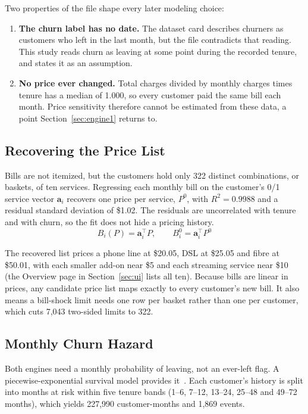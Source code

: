 \documentclass[conference]{IEEEtran}
\begin{document}
Two properties of the file shape every later modeling choice:
\begin{enumerate}
\item \textbf{The churn label has no date.} The dataset card describes churners as customers who left in the last month, but the file contradicts that reading. This study reads churn as leaving at some point during the recorded tenure, and states it as an assumption.
\item \textbf{No price ever changed.} Total charges divided by monthly charges times tenure has a median of 1.000, so every customer paid the same bill each month. Price sensitivity therefore cannot be estimated from these data, a point Section~\ref{sec:engine1} returns to.
\end{enumerate}

\subsection{Recovering the Price List}

Bills are not itemized, but the customers hold only 322 distinct combinations, or baskets, of ten services. Regressing each monthly bill on the customer's 0/1 service vector $\mathbf{a}_i$ recovers one price per service, $P^0$, with $R^2 = 0.9988$ and a residual standard deviation of \$1.02. The residuals are uncorrelated with tenure and with churn, so the fit does not hide a pricing history.
\begin{equation}
B_i(P) = \mathbf{a}_i^{\top} P, \qquad B_i^{0} = \mathbf{a}_i^{\top} P^{0}
\label{eq:bill}
\end{equation}

The recovered list prices a phone line at \$20.05, DSL at \$25.05 and fibre at \$50.01, with each smaller add-on near \$5 and each streaming service near \$10 (the Overview page in Section~\ref{sec:ui} lists all ten). Because bills are linear in prices, any candidate price list maps exactly to every customer's new bill. It also means a bill-shock limit needs one row per basket rather than one per customer, which cuts 7,043 two-sided limits to 322.

\subsection{Monthly Churn Hazard}
\label{sec:hazard}

Both engines need a monthly probability of leaving, not an ever-left flag. A piecewise-exponential survival model provides it~\cite{b9}. Each customer's history is split into months at risk within five tenure bands (1--6, 7--12, 13--24, 25--48 and 49--72 months), which yields 227,990 customer-months and 1,869 events.
\end{document}
